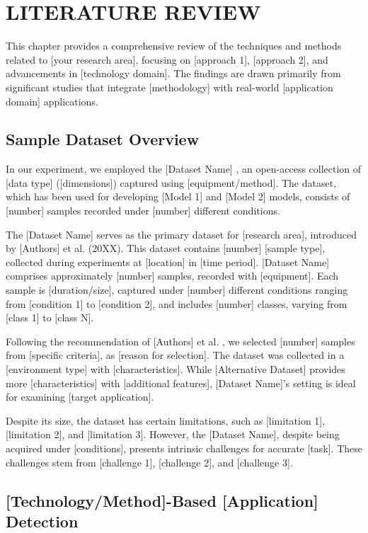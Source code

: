 \chapter{LITERATURE REVIEW}

This chapter provides a comprehensive review of the techniques and methods related to [your research area], focusing on [approach 1], [approach 2], and advancements in [technology domain]. The findings are drawn primarily from significant studies that integrate [methodology] with real-world [application domain] applications.

\section{Sample Dataset Overview}

In our experiment, we employed the [Dataset Name] \cite{haynes2016crc}, an open-access collection of [data type] ([dimensions]) captured using [equipment/method]. The dataset, which has been used for developing [Model 1] \cite{haynes2016crc} and [Model 2] \cite{ravikumar2016optical} models, consists of [number] samples recorded under [number] different conditions.

The [Dataset Name] serves as the primary dataset for [research area], introduced by [Authors] et al. (20XX). This dataset contains [number] [sample type], collected during experiments at [location] in [time period]. [Dataset Name] comprises approximately [number] samples, recorded with [equipment]. Each sample is [duration/size], captured under [number] different conditions ranging from [condition 1] to [condition 2], and includes [number] classes, varying from [class 1] to [class N].

Following the recommendation of [Authors] et al. \cite{haynes2016crc}, we selected [number] samples from [specific criteria], as [reason for selection]. The dataset was collected in a [environment type] with [characteristics]. While [Alternative Dataset] \cite{haynes2016crc} provides more [characteristics] with [additional features], [Dataset Name]'s setting is ideal for examining [target application].

Despite its size, the dataset has certain limitations, such as [limitation 1], [limitation 2], and [limitation 3]. However, the [Dataset Name], despite being acquired under [conditions], presents intrinsic challenges for accurate [task]. These challenges stem from [challenge 1], [challenge 2], and [challenge 3].

\section{[Technology/Method]-Based [Application] Detection}

